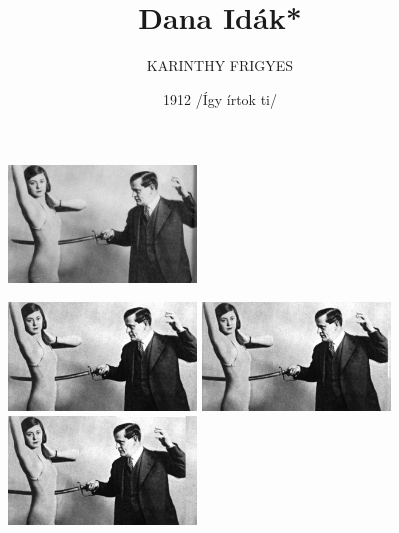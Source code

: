 \documentclass  [12pt]{article}
\author {KARINTHY FRIGYES}
\date{1912   /Így írtok ti/}
\title{Dana Idák*  }
\begin{document}
\begin{titlepage}
    \maketitle
\end{titlepage}




\begin{figure}
\begin{center}
\includegraphics[angle=5, width=5cm]{igy_irtok_ti.jpeg}
\end{center}
\end{figure}


\begin{figure}
\begin{center}
\includegraphics[angle=5, width=5cm]{Frici1.png}
\includegraphics[angle=5, width=5cm]{Frici3.png}
\includegraphics[angle=5, width=5cm]{Frici5.png}
\end{center}
\end{figure}
\end{document}
